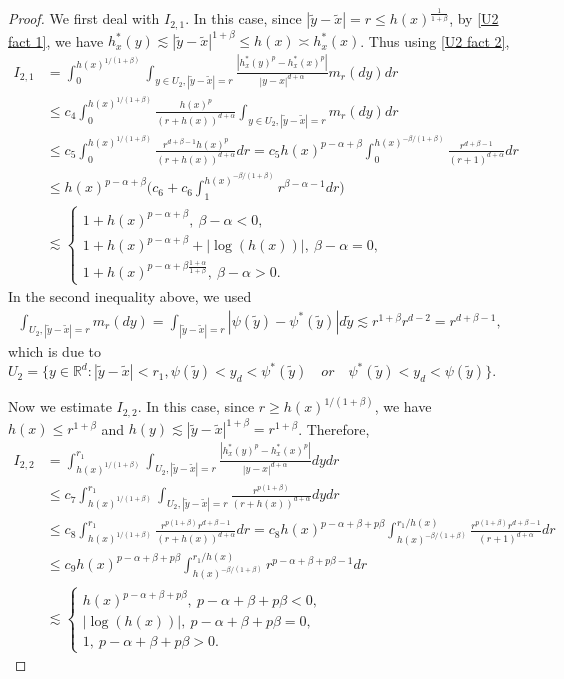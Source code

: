 \documentclass[12pt,a4paper]{amsart}
\numberwithin{equation}{section}
\theoremstyle{plain}
\newcommand{\al}{\alpha}
\newcommand{\be}{\beta}
\newcommand{\mb}{\mathbb}
\newcommand{\wt}{\widetilde}
\newcommand{\1}{\mathbbm{1}}
\begin{document}
\begin{proof}
We first deal with $I_{2,1}$. In this case, since $|\wt y - \wt x| =r \le h(x)^{\frac{1}{1+\be}}$, by \eqref{U2 fact 1}, we have $h_x^*(y) \lesssim |\wt y - \wt x|^{1+\beta} \le h(x)\asymp h_x^*(x)$. Thus using \eqref{U2 fact 2},
\begin{align*}
I_{2,1} &= \int_{0}^{h(x)^{1/(1+\be)}} \int_{y \in U_2, |\wt y - \wt x| = r} \frac{|h_x^*(y)^p - h_x^*(x)^p|}{|y-x|^{d+\alpha}}m_r(dy) dr \\
& \le c_4 \int_0^{h(x)^{1/(1+\be)}} \frac{h(x)^p}{(r + h(x))^{d+\alpha}}  \int_{y \in U_2, |\wt y - \wt x| = r}   m_r(dy) dr  \\
& \le c_5 \int_0^{h(x)^{1/ (1+\be)}}  \frac{r^{d+\be - 1} h(x)^p}{(r + h(x))^{d+\alpha}} dr  = c_5 h(x)^{p-\alpha + \beta} \int_0^{h(x)^{-\be/(1+\be)}} \frac{r^{d+\beta - 1}}{(r+1)^{d+\alpha}} dr \\
& \le h(x)^{p-\alpha + \be}\big(c_{6} + c_{6} \int_1^{h(x)^{-\be/(1+\be)}}r^{\be - \alpha -1}dr\big) \\
& \lesssim
\begin{cases}
1+ h(x)^{p-\alpha + \be},\ \be - \al < 0, \\
1+ h(x)^{p-\alpha + \be} + |\log(h(x))|,\ \be - \al= 0, \\
1 + h(x)^{p-\alpha + \beta \frac{1+\alpha}{1+\be}},\ \be - \al>0.
\end{cases}
\end{align*}
In the second inequality above, we used
\begin{align*}
\int_{U_2, |\wt y - \wt x|= r} m_r(dy) = \int_{|\wt y - \wt x| = r} |\psi(\wt y) - \psi^*(\wt y)| d\wt y \lesssim r^{1+\be} r^{d-2} = r^{d+\be - 1},
\end{align*}
which is due to 
$U_2 = \{y \in \mb R^d: |\wt y - \wt x| < r_1, \psi(\wt y)< y_d < \psi^*(\wt y)\quad or\quad  \psi^*(\wt y)< y_d <\psi(\wt y)\}$.

Now we estimate $I_{2,2}$. In this case, since $r \ge h(x)^{1/(1+\be)}$, we have $h(x) \le r^{1+\beta}$ and $h(y)\lesssim |\wt y - \wt x|^{1+\beta} = r^{1+\beta}$. Therefore,
\begin{align*}
I_{2,2} &= \int_{h(x)^{1/(1+\be)}}^{r_1} \int_{U_2, |\wt y - \wt x| = r} \frac{|h_x^*(y)^p - h_x^*(x)^p|}{|y-x|^{d+\alpha}}dy dr \\
& \le c_7 \int_{h(x)^{1/(1+\be)}}^{r_1} \int_{U_2, |\wt y - \wt x| = r} \frac{r^{p(1+\be)}}{(r+h(x))^{d+\alpha}}dy dr \\
& \le c_8 \int_{h(x)^{1/(1+\be)}}^{r_1}  \frac{r^{p(1+\be)} r^{d+\be -1}}{(r+h(x))^{d+\alpha}}dr = c_{8} h(x)^{p-\alpha + \be + p\beta}\int_{h(x)^{-\be/(1+\be)}}^{r_1/h(x)}  \frac{r^{p(1+\be)} r^{d+\be -1}}{(r+1)^{d+\alpha}}dr \\
& \le c_{9} h(x)^{p-\alpha + \be + p\beta}\int_{h(x)^{-\be/(1+\be)}}^{r_1/h(x)} r^{p- \alpha + \be + p \beta - 1}dr \\
& \lesssim 
\begin{cases}
h(x)^{p-\alpha + \be + p\be},\ p-\alpha + \be + p\be < 0, \\
|\log(h(x))|,\ p-\alpha + \be + p\be= 0, \\
1,\ p-\alpha + \be + p\be>0.
\end{cases}
\end{align*}


\end{proof}
\end{document}
